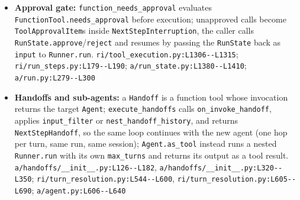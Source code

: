 \begin{itemize}
\item \textbf{Approval gate:} \texttt{function\_\allowbreak{}needs\_\allowbreak{}approval} evaluates \texttt{FunctionTool.\allowbreak{}needs\_\allowbreak{}approval} before execution; unapproved calls become \texttt{ToolApprovalItem}s inside \texttt{NextStepInterruption}, the caller calls \texttt{RunState.\allowbreak{}approve}/\texttt{reject} and resumes by passing the \texttt{RunState} back as \texttt{input} to \texttt{Runner.\allowbreak{}run}. \texttt{ri/\allowbreak{}tool\_\allowbreak{}execution.\allowbreak{}py:\allowbreak{}L1306-\allowbreak{}-\allowbreak{}L1315}; \texttt{ri/\allowbreak{}run\_\allowbreak{}steps.\allowbreak{}py:\allowbreak{}L179-\allowbreak{}-\allowbreak{}L190}; \texttt{a/\allowbreak{}run\_\allowbreak{}state.\allowbreak{}py:\allowbreak{}L1380-\allowbreak{}-\allowbreak{}L1410}; \texttt{a/\allowbreak{}run.\allowbreak{}py:\allowbreak{}L279-\allowbreak{}-\allowbreak{}L300}
\item \textbf{Handoffs and sub-agents:} a \texttt{Handoff} is a function tool whose invocation returns the target \texttt{Agent}; \texttt{execute\_\allowbreak{}handoffs} calls \texttt{on\_\allowbreak{}invoke\_\allowbreak{}handoff}, applies \texttt{input\_\allowbreak{}filter} or \texttt{nest\_\allowbreak{}handoff\_\allowbreak{}history}, and returns \texttt{NextStepHandoff}, so the same loop continues with the new agent (one hop per turn, same run, same session); \texttt{Agent.\allowbreak{}as\_\allowbreak{}tool} instead runs a nested \texttt{Runner.\allowbreak{}run} with its own \texttt{max\_\allowbreak{}turns} and returns its output as a tool result. \texttt{a/\allowbreak{}handoffs/\allowbreak{}\_\allowbreak{}\_\allowbreak{}init\_\allowbreak{}\_\allowbreak{}.\allowbreak{}py:\allowbreak{}L126-\allowbreak{}-\allowbreak{}L182}, \texttt{a/\allowbreak{}handoffs/\allowbreak{}\_\allowbreak{}\_\allowbreak{}init\_\allowbreak{}\_\allowbreak{}.\allowbreak{}py:\allowbreak{}L320-\allowbreak{}-\allowbreak{}L350}; \texttt{ri/\allowbreak{}turn\_\allowbreak{}resolution.\allowbreak{}py:\allowbreak{}L544-\allowbreak{}-\allowbreak{}L600}, \texttt{ri/\allowbreak{}turn\_\allowbreak{}resolution.\allowbreak{}py:\allowbreak{}L605-\allowbreak{}-\allowbreak{}L690}; \texttt{a/\allowbreak{}agent.\allowbreak{}py:\allowbreak{}L606-\allowbreak{}-\allowbreak{}L640}
\end{itemize}

